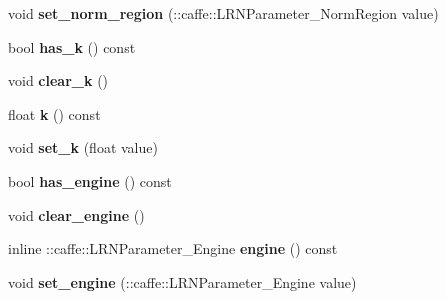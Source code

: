 \begin{DoxyCompactItemize}
\mbox{\label{classcaffe_1_1_l_r_n_parameter_ac67e8a00e6c9261c16323958c90d3132}} 
void {\bfseries set\+\_\+norm\+\_\+region} (\+::caffe\+::\+L\+R\+N\+Parameter\+\_\+\+Norm\+Region value)
\item 
\mbox{\label{classcaffe_1_1_l_r_n_parameter_aadff1fb95a7fcfc5bccd7437cd9e53d8}} 
bool {\bfseries has\+\_\+k} () const
\item 
\mbox{\label{classcaffe_1_1_l_r_n_parameter_ae5aae57bb84667f24b81ffc40075e8b4}} 
void {\bfseries clear\+\_\+k} ()
\item 
\mbox{\label{classcaffe_1_1_l_r_n_parameter_adaff01405b00b1f57e98293cf34fb625}} 
float {\bfseries k} () const
\item 
\mbox{\label{classcaffe_1_1_l_r_n_parameter_aa3e97b8b626a261f2776cb009f7896c6}} 
void {\bfseries set\+\_\+k} (float value)
\item 
\mbox{\label{classcaffe_1_1_l_r_n_parameter_ab67bd760719f898a46c3977b80105847}} 
bool {\bfseries has\+\_\+engine} () const
\item 
\mbox{\label{classcaffe_1_1_l_r_n_parameter_aaf26e5acd07b82af851b4609adff1e5b}} 
void {\bfseries clear\+\_\+engine} ()
\item 
\mbox{\label{classcaffe_1_1_l_r_n_parameter_a823d035c00629443cd701ad4a24678b2}} 
inline \+::caffe\+::\+L\+R\+N\+Parameter\+\_\+\+Engine {\bfseries engine} () const
\item 
\mbox{\label{classcaffe_1_1_l_r_n_parameter_a9fcab56fffaa5eec6ce3a116764ad053}} 
void {\bfseries set\+\_\+engine} (\+::caffe\+::\+L\+R\+N\+Parameter\+\_\+\+Engine value)
\end{DoxyCompactItemize}
